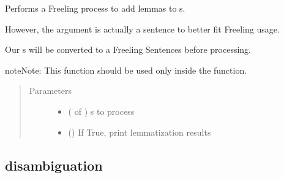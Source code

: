 \documentclass[letterpaper,10pt,english]{sphinxmanual}
\begin{document}
\begin{fulllineitems}
\label{\detokenize{index:loacore.process.lemma_process.add_lemmas_to_sentences}}
Performs a Freeling process to add lemmas to  s.

However, the argument is actually a sentence to better fit Freeling usage.

Our  s will be converted to a Freeling Sentences before processing.

\begin{sphinxadmonition}{note}{Note:}
This function should be used only inside the  function.
\end{sphinxadmonition}
\begin{quote}\begin{description}
\item[{Parameters}] \leavevmode\begin{itemize}
\item {} 
 ( of ) \textendash{}  s to process

\item {} 
 () \textendash{} If True, print lemmatization results

\end{itemize}

\end{description}\end{quote}

\end{fulllineitems}



\subsection{disambiguation}
\label{\detokenize{index:module-loacore.process.synset_process}}\label{\detokenize{index:disambiguation}}
\end{document}
